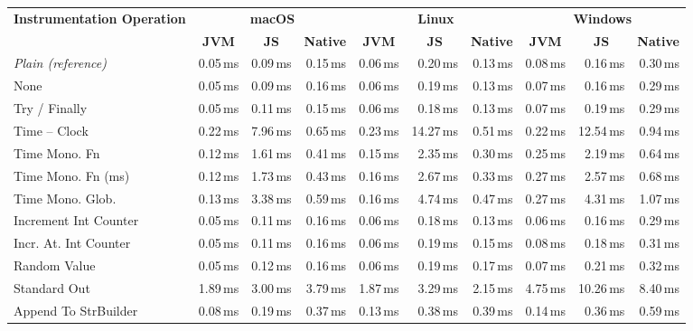 \begin{tabular}{lrrrrrrrrr}
\toprule
\textbf{Instrumentation Operation} & \multicolumn{3}{c}{\textbf{macOS}} & \multicolumn{3}{c}{\textbf{Linux}} & \multicolumn{3}{c}{\textbf{Windows}} \\
 & \multicolumn{1}{c}{\textbf{JVM}} & \multicolumn{1}{c}{\textbf{JS}} & \multicolumn{1}{c}{\textbf{Native}} & \multicolumn{1}{c}{\textbf{JVM}} & \multicolumn{1}{c}{\textbf{JS}} & \multicolumn{1}{c}{\textbf{Native}} & \multicolumn{1}{c}{\textbf{JVM}} & \multicolumn{1}{c}{\textbf{JS}} & \multicolumn{1}{c}{\textbf{Native}} \\
\cmidrule(lr){2-4}
\cmidrule(lr){5-7}
\cmidrule(lr){8-10}
\midrule
\textit{Plain (reference)} & 0.05\,ms & 0.09\,ms & 0.15\,ms & 0.06\,ms & 0.20\,ms & 0.13\,ms & 0.08\,ms & 0.16\,ms & 0.30\,ms \\
\midrule
None & 0.05\,ms & 0.09\,ms & 0.16\,ms & 0.06\,ms & 0.19\,ms & 0.13\,ms & 0.07\,ms & 0.16\,ms & 0.29\,ms \\
Try / Finally & 0.05\,ms & 0.11\,ms & 0.15\,ms & 0.06\,ms & 0.18\,ms & 0.13\,ms & 0.07\,ms & 0.19\,ms & 0.29\,ms \\
Time -- Clock & 0.22\,ms & 7.96\,ms & 0.65\,ms & 0.23\,ms & 14.27\,ms & 0.51\,ms & 0.22\,ms & 12.54\,ms & 0.94\,ms \\
Time Mono. Fn & 0.12\,ms & 1.61\,ms & 0.41\,ms & 0.15\,ms & 2.35\,ms & 0.30\,ms & 0.25\,ms & 2.19\,ms & 0.64\,ms \\
Time Mono. Fn (ms) & 0.12\,ms & 1.73\,ms & 0.43\,ms & 0.16\,ms & 2.67\,ms & 0.33\,ms & 0.27\,ms & 2.57\,ms & 0.68\,ms \\
Time Mono. Glob. & 0.13\,ms & 3.38\,ms & 0.59\,ms & 0.16\,ms & 4.74\,ms & 0.47\,ms & 0.27\,ms & 4.31\,ms & 1.07\,ms \\
Increment Int Counter & 0.05\,ms & 0.11\,ms & 0.16\,ms & 0.06\,ms & 0.18\,ms & 0.13\,ms & 0.06\,ms & 0.16\,ms & 0.29\,ms \\
Incr. At. Int Counter & 0.05\,ms & 0.11\,ms & 0.16\,ms & 0.06\,ms & 0.19\,ms & 0.15\,ms & 0.08\,ms & 0.18\,ms & 0.31\,ms \\
Random Value & 0.05\,ms & 0.12\,ms & 0.16\,ms & 0.06\,ms & 0.19\,ms & 0.17\,ms & 0.07\,ms & 0.21\,ms & 0.32\,ms \\
Standard Out & 1.89\,ms & 3.00\,ms & 3.79\,ms & 1.87\,ms & 3.29\,ms & 2.15\,ms & 4.75\,ms & 10.26\,ms & 8.40\,ms \\
Append To StrBuilder & 0.08\,ms & 0.19\,ms & 0.37\,ms & 0.13\,ms & 0.38\,ms & 0.39\,ms & 0.14\,ms & 0.36\,ms & 0.59\,ms \\

\end{tabular}
